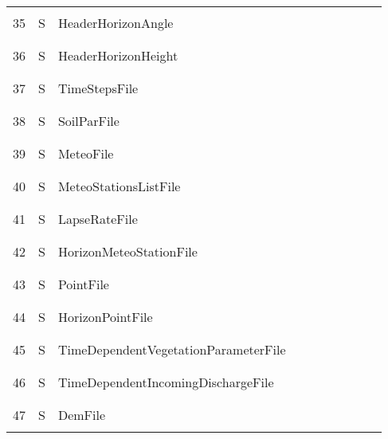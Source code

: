 \begin{longtable}{|c|c|l|c|c|c|c|p{}|c|p{}|}
&&&&&&&&&\\\hline%
&&&&&&&&&\\
35 & S & HeaderHorizonAngle & & & & & & & \\
&&&&&&&&&\\\hline%
&&&&&&&&&\\
36 & S & HeaderHorizonHeight & & & & & & & \\
&&&&&&&&&\\\hline%
&&&&&&&&&\\
37 & S & TimeStepsFile & & & & & & & \\
&&&&&&&&&\\\hline%
&&&&&&&&&\\
38 & S & SoilParFile & & & & & & & \\
&&&&&&&&&\\\hline%
&&&&&&&&&\\
39 & S & MeteoFile & & & & & & & \\
&&&&&&&&&\\\hline%
&&&&&&&&&\\
40 & S & MeteoStationsListFile & & & & & & & \\
&&&&&&&&&\\\hline%
&&&&&&&&&\\
41 & S & LapseRateFile & & & & & & & \\
&&&&&&&&&\\\hline%
&&&&&&&&&\\
42 & S & HorizonMeteoStationFile & & & & & & & \\
&&&&&&&&&\\\hline%
&&&&&&&&&\\
43 & S & PointFile & & & & & & & \\
&&&&&&&&&\\\hline%
&&&&&&&&&\\
44 & S & HorizonPointFile & & & & & & & \\
&&&&&&&&&\\\hline%
&&&&&&&&&\\
45 & S & TimeDependentVegetationParameterFile & & & & & & & \\
&&&&&&&&&\\\hline%
&&&&&&&&&\\
46 & S & TimeDependentIncomingDischargeFile & & & & & & & \\
&&&&&&&&&\\\hline%
&&&&&&&&&\\
47 & S & DemFile & & & & & & & \\
&&&&&&&&&\\\hline%

\end{longtable}

